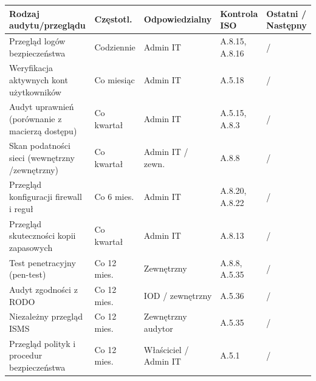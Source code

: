 \documentclass[12pt,a4paper]{article}
\begin{document}
\begin{longtable}{@{}>{\raggedright\arraybackslash}p{}>{\raggedright\arraybackslash}p{}>{\raggedright\arraybackslash}p{}>{\raggedright\arraybackslash}p{}>{\raggedright\arraybackslash}p{}@{}}
\toprule\noalign{}
Rodzaj audytu/przeglądu & Częstotl. & Odpowiedzialny & Kontrola ISO & Ostatni / Następny \\
\midrule\noalign{}
\endhead
\bottomrule\noalign{}
\endlastfoot
Przegląd logów bezpieczeństwa & Codziennie & Admin IT & A.8.15, A.8.16 & \underline{\hspace{1.5cm}} / \underline{\hspace{1.5cm}} \\
Weryfikacja aktywnych kont użytkowników & Co miesiąc & Admin IT & A.5.18 & \underline{\hspace{1.5cm}} / \underline{\hspace{1.5cm}} \\
Audyt uprawnień (porównanie z macierzą dostępu) & Co kwartał & Admin IT & A.5.15, A.8.3 & \underline{\hspace{1.5cm}} / \underline{\hspace{1.5cm}} \\
Skan podatności sieci (wewnętrzny /zewnętrzny) & Co kwartał & Admin IT / zewn. & A.8.8 & \underline{\hspace{1.5cm}} / \underline{\hspace{1.5cm}} \\
Przegląd konfiguracji firewall i reguł & Co 6 mies. & Admin IT & A.8.20, A.8.22 & \underline{\hspace{1.5cm}} / \underline{\hspace{1.5cm}} \\
Przegląd skuteczności kopii zapasowych & Co kwartał & Admin IT & A.8.13 & \underline{\hspace{1.5cm}} / \underline{\hspace{1.5cm}} \\
Test penetracyjny (pen-test) & Co 12 mies. & Zewnętrzny & A.8.8, A.5.35 & \underline{\hspace{1.5cm}} / \underline{\hspace{1.5cm}} \\
Audyt zgodności z RODO & Co 12 mies. & IOD / zewnętrzny & A.5.36 & \underline{\hspace{1.5cm}} / \underline{\hspace{1.5cm}} \\
Niezależny przegląd ISMS & Co 12 mies. & Zewnętrzny audytor & A.5.35 & \underline{\hspace{1.5cm}} / \underline{\hspace{1.5cm}} \\
Przegląd polityk i procedur bezpieczeństwa & Co 12 mies. & Właściciel / Admin IT & A.5.1 & \underline{\hspace{1.5cm}} / \underline{\hspace{1.5cm}} \\
\end{longtable}
\end{document}
